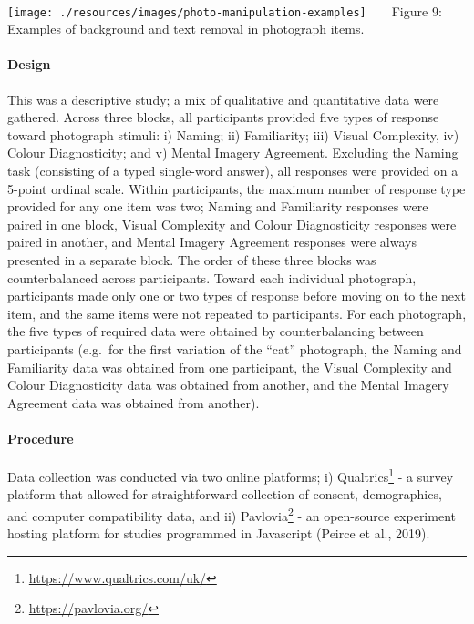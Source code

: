 \documentclass[
  11pt,
]{article}
\begin{document}
~ ~

\texttt{[image: ./resources/images/photo-manipulation-examples]}
~ ~ Figure 9: Examples of background and text removal in photograph
items. ~ ~

\hypertarget{design-1}{%
\paragraph{Design}\label{design-1}}

This was a descriptive study; a mix of qualitative and quantitative data
were gathered. Across three blocks, all participants provided five types
of response toward photograph stimuli: i) Naming; ii) Familiarity; iii)
Visual Complexity, iv) Colour Diagnosticity; and v) Mental Imagery
Agreement. Excluding the Naming task (consisting of a typed single-word
answer), all responses were provided on a 5-point ordinal scale. Within
participants, the maximum number of response type provided for any one
item was two; Naming and Familiarity responses were paired in one block,
Visual Complexity and Colour Diagnosticity responses were paired in
another, and Mental Imagery Agreement responses were always presented in
a separate block. The order of these three blocks was counterbalanced
across participants. Toward each individual photograph, participants
made only one or two types of response before moving on to the next
item, and the same items were not repeated to participants. For each
photograph, the five types of required data were obtained by
counterbalancing between participants (e.g.~for the first variation of
the ``cat'' photograph, the Naming and Familiarity data was obtained
from one participant, the Visual Complexity and Colour Diagnosticity
data was obtained from another, and the Mental Imagery Agreement data
was obtained from another).

\hypertarget{procedure-1}{%
\paragraph{Procedure}\label{procedure-1}}

Data collection was conducted via two online platforms; i)
Qualtrics\footnote{\url{https://www.qualtrics.com/uk/}} - a survey
platform that allowed for straightforward collection of consent,
demographics, and computer compatibility data, and ii)
Pavlovia\footnote{\url{https://pavlovia.org/}} - an open-source
experiment hosting platform for studies programmed in Javascript (Peirce
et al., 2019).
\end{document}

